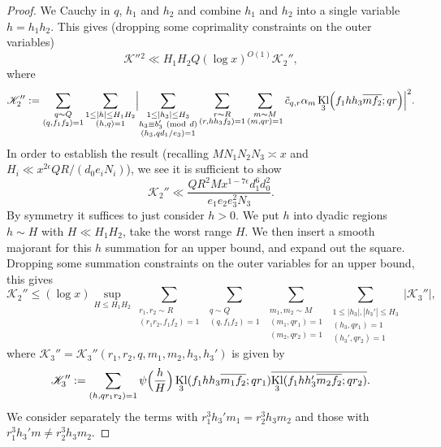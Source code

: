 \documentclass[10pt]{amsart}
\theoremstyle{plain}
\numberwithin{equation}{section}
\DeclareMathOperator{\Kl}{Kl}
\newcommand{\Mod}[1]{\ (\mathrm{mod}\ #1)}
\begin{document}
\begin{proof}
We Cauchy in $q$, $h_1$ and $h_2$ and combine $h_1$ and $h_2$ into a single variable $h=h_1h_2$. This gives (dropping some coprimality constraints on the outer variables)
\[
\mathscr{K}''{}^2\ll H_1 H_2 Q (\log{x} )^{O(1)}\mathscr{K}_2'',
\]
where
\begin{align*}
\mathscr{K}_2'':=
\sum_{\substack{q\sim Q\\ (q,f_1f_2)=1}}\sum_{\substack{1\le |h|\le H_1H_2\\ (h,q)=1}}\Bigl|\sum_{\substack{1\le |h_3|\le H_3 \\ h_3\equiv b_3'\Mod{d}\\ (h_3,q d_1/e_3)=1}}\sum_{\substack{r\sim R\\ (r,h h_3 f_2)=1}}\sum_{\substack{m\sim M\\ (m,q r)=1}}\tilde{c}_{q,r}\alpha_m \Kl_3\Bigl(f_1 h h_3\overline{m f_2};q r\Bigr)\Bigr|^2.
\end{align*}
In order to establish the result (recalling $M N_1 N_2 N_3\asymp x$ and $H_i\ll x^{2\epsilon} QR/(d_0e_i N_i)$), we see it is sufficient to show
\begin{equation}
\mathscr{K}_2''\ll \frac{Q R^2M x^{1-7\epsilon} d_1^6 d_0^2}{e_1 e_2 e_3^2 N_3}.
\label{eq:E4Target}
\end{equation}
By symmetry it suffices to just consider $h>0$. We put $h$ into dyadic regions $h\sim H$ with $H\ll H_1H_2$, take the worst range $H$. We then insert a smooth majorant for this $h$ summation for an upper bound, and expand out the square. Dropping some summation constraints on the outer variables for an upper bound, this gives
\[
\mathscr{K}_2''\le (\log{x})\sup_{H\le H_1H_2}\sum_{\substack{r_1,r_2 \sim R\\ (r_1r_2,f_1f_2)=1}}\sum_{\substack{q\sim Q\\ (q,f_1f_2)=1}}\sum_{\substack{m_1,m_2\sim M\\ (m_1,qr_1)=1 \\ (m_2,q r_2)=1}}\sum_{\substack{1\le |h_3|,|h_3'|\le H_3\\ (h_3,qr_1)=1\\ (h_3',q r_2)=1}}|\mathscr{K}_3''|,
\]
where $\mathscr{K}_3''=\mathscr{K}_3''(r_1,r_2,q,m_1,m_2,h_3,h_3')$ is given by
\[
\mathscr{K}_3'':=\sum_{\substack{ (h,q r_1 r_2)=1}}\psi\Bigl(\frac{h}{H}\Bigr)\Kl_3(f_1 h h_3\overline{m_1 f_2};q r_1)\overline{\Kl_3(f_1 h h_3'\overline{m_2 f_2};q r_2)}.
\]
We consider separately the terms with $r_1^3h_3'm_1= r_2^3 h_3m_2$ and those with $r_1^3 h_3' m\ne r_2^3 h_3 m_2$.


\end{proof}
\end{document}
